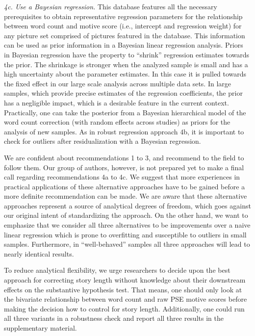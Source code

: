 \documentclass[man,a4paper,mask]{apa6}\usepackage[]{graphicx}\usepackage[]{color}
\begin{document}
\emph{4c. Use a Bayesian regression.} This database features all the necessary prerequisites to obtain representative regression parameters for the relationship between word count and motive score (i.e., intercept and regression weight) for any picture set comprised of pictures featured in the database. This information can be used as prior information in a Bayesian linear regression analysis. Priors in Bayesian regression have the property to ``shrink'' regression estimates towards the prior. The shrinkage is stronger when the analyzed sample is small and has a high uncertainty about the parameter estimates. In this case it is pulled towards the fixed effect in our large scale analysis across multiple data sets. In large samples, which provide precise estimates of the regression coefficients, the prior has a negligible impact, which is a desirable feature in the current context. 
Practically, one can take the posterior from a Bayesian hierarchical model of the word count correction (with random effects across studies) as priors for the analysis of new samples. 
As in robust regression approach 4b, it is important to check for outliers after residualization with a Bayesian regression.


We are confident about recommendations 1 to 3, and recommend to the field to follow them. Our group of authors, however, is not prepared yet to make a final call regarding recommendations 4a to 4c. We suggest that more experiences in practical applications of these alternative approaches have to be gained before a more definite recommendation can be made. We are aware that these alternative approaches represent a source of analytical degrees of freedom, which goes against our original intent of standardizing the approach. On the other hand, we want to emphasize that we consider all three alternatives to be improvements over a naive linear regression which is prone to overfitting and susceptible to outliers in small samples. Furthermore, in ``well-behaved'' samples all three approaches will lead to nearly identical results.

To reduce analytical flexibility, we urge researchers to decide upon the best approach for correcting story length without knowledge about their downstream effects on the substantive hypothesis test. That means, one should only look at the bivariate relationship between word count and raw PSE motive scores before making the decision how to control for story length. Additionally, one could run all three variants in a robustness check and report all three results in the supplementary material.
\end{document}
